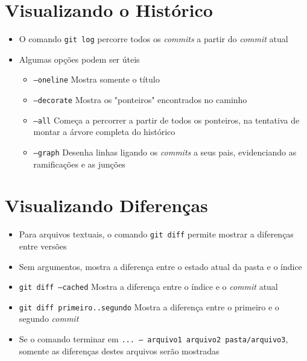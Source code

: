 \documentclass{beamer}
\newenvironment{slide}{\begin{frame}{\insertsection}}{\end{frame}}
\begin{document}
\section{Visualizando o Histórico}
\begin{slide}
    \begin{itemize}
        \item O comando \texttt{git log} percorre todos os \emph{commits} a
            partir do \emph{commit} atual
        \pause
        \item Algumas opções podem ser úteis
        \begin{itemize}
            \pause
            \item \texttt{--oneline} Mostra somente o título
            \pause
            \item \texttt{--decorate} Mostra os "ponteiros" encontrados no
                caminho
            \pause
            \item \texttt{--all} Começa a percorrer a partir de todos os
                ponteiros, na tentativa de montar a árvore completa do histórico
            \pause
            \item \texttt{--graph} Desenha linhas ligando os \emph{commits} a
                seus pais, evidenciando as ramificações e as junções
        \end{itemize}
    \end{itemize}
\end{slide}

\section{Visualizando Diferenças}
\begin{slide}
    \begin{itemize}
        \item Para arquivos textuais, o comando \texttt{git diff} permite
            mostrar a diferenças entre versões
        \pause
        \item Sem argumentos, mostra a diferença entre o estado atual da pasta
            e o índice
        \pause
        \item \texttt{git diff --cached} Mostra a diferença entre o índice e o
            \emph{commit} atual
        \pause
        \item \texttt{git diff primeiro..segundo} Mostra a diferença entre o
            primeiro e o segundo \emph{commit}
        \pause
        \item Se o comando terminar em \texttt{... -- arquivo1 arquivo2
            pasta/arquivo3}, somente as diferenças destes arquivos serão
            mostradas
    \end{itemize}
\end{slide}
\end{document}
